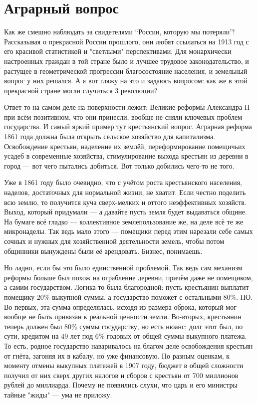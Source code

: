 \chapter{Аграрный вопрос}

Как же смешно наблюдать за свидетелями “России, которую мы потеряли”! Рассказывая о прекрасной России прошлого, они любят ссылаться на 1913 год с его красивой статистикой и "светлыми" перспективами. Для монархически настроенных граждан в той стране было и лучшее трудовое законодательство, и растущее в геометрической прогрессии благосостояние населения, и земельный вопрос у них решался. А я вот гляжу на это и задаюсь вопросом: как же в этой прекрасной стране могли случиться 3 революции?

Ответ-то на самом деле на поверхности лежит: Великие реформы Александра II при всём позитивном, что они принесли, вообще не сняли ключевых проблем государства. И самый яркий пример тут крестьянский вопрос. Аграрная реформа 1861 года должна была открыть сельское хозяйство для капитализма. Освобождение крестьян, наделение их землёй, переформирование помещичьих усадеб в современные хозяйства, стимулирование выхода крестьян из деревни в город — вот чего пытались добиться. Вот только добились чего-то не того.

Уже в 1861 году было очевидно, что с учётом роста крестьянского населения, наделов, достаточных для нормальной жизни, не хватит. Если честно поделить всю землю, то получится куча сверх-мелких и оттого неэффективных хозяйств. Выход, который придумали — а давайте пусть земля будет выдаваться общине. На бумаге всё гладко — коллективное землепользование же, на деле всё те же микронаделы. Так ведь мало этого — помещики перед этим нарезали себе самых сочных и нужных для хозяйственной деятельности земель, чтобы потом общинники вынуждены были её арендовать. Бизнес, понимаешь.

Но ладно, если бы это было единственной проблемой. Так ведь сам механизм реформы больше был похож на ограбление деревни, причём даже не помещиком, а самим государством. Логика-то была благородной: пусть крестьянин выплатит помещику 20\% выкупной суммы, а государство поможет с остальными 80\%. НО. Во-первых, эта сумма определялась, исходя из размера оброка, который мог вообще не быть привязан к реальной ценности земли. Во-вторых, крестьянин теперь должен был 80\% суммы государству, но есть нюанс: долг этот был, по сути, кредитом на 49 лет под 6\% годовых от общей суммы выкупного платежа. То есть, родное государство наваривалось на благом деле освобождения крестьян от гнёта, загоняя их в кабалу, но уже финансовую. По разным оценкам, к моменту отмены выкупных платежей в 1907 году, бюджет в общей сложности получил от них сверх других налогов и сборов с крестьян от 700 миллионов рублей до миллиарда. Почему не появились слухи, что царь и его министры тайные "жиды" — ума не приложу.

